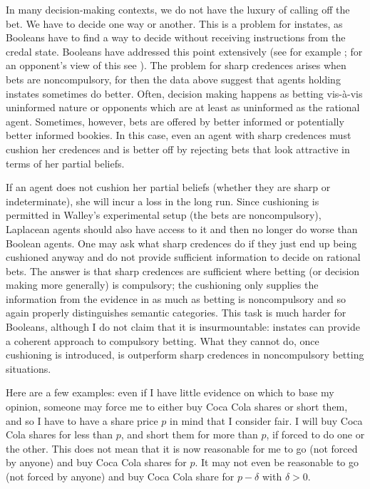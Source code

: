 \documentclass[11pt]{article}
\begin{document}
In many decision-making contexts, we do not have the luxury of calling off the bet. We have to decide one way or another. This is a problem for instates, as Booleans have to find a way to decide without receiving instructions from the credal state. Booleans have addressed this point extensively (see for example ; for an opponent's view of this see ). The problem for sharp credences arises when bets are noncompulsory, for then the data above suggest that agents holding instates sometimes do better. Often, decision making happens as betting vis-{\`a}-vis uninformed nature or opponents which are at least as uninformed as the rational agent. Sometimes, however, bets are offered by better informed or potentially better informed bookies. In this case, even an agent with sharp credences must cushion her credences and is better off by rejecting bets that look attractive in terms of her partial beliefs. 

If an agent does not cushion her partial beliefs (whether they are sharp or indeterminate), she will incur a loss in the long run. Since cushioning is permitted in Walley's experimental setup (the bets are noncompulsory), Laplacean agents should also have access to it and then no longer do worse than Boolean agents. One may ask what sharp credences do if they just end up being cushioned anyway and do not provide sufficient information to decide on rational bets. The answer is that sharp credences are sufficient where betting (or decision making more generally) is compulsory; the cushioning only supplies the information from the evidence in as much as betting is noncompulsory and so again properly distinguishes semantic categories. This task is much harder for Booleans, although I do not claim that it is insurmountable: instates can provide a coherent approach to compulsory betting. What they cannot do, once cushioning is introduced, is outperform sharp credences in noncompulsory betting situations.

Here are a few examples: even if I have little evidence on which to base my opinion, someone may force me to either buy Coca Cola shares or short them, and so I have to have a share price $p$ in mind that I consider fair. I will buy Coca Cola shares for less than $p$, and short them for more than $p$, if forced to do one or the other. This does not mean that it is now reasonable for me to go (not forced by anyone) and buy Coca Cola shares for $p$. It may not even be reasonable to go (not forced by anyone) and buy Coca Cola share for $p-\delta$ with $\delta{}>0$.
\end{document}
